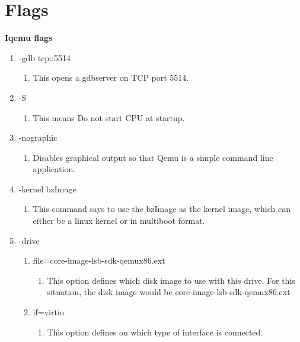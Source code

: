 \documentclass[journal,10pt,onecolumn,compsoc]{IEEEtran} \usepackage[margin=1.0in]{geometry} \usepackage{pdfpages}
\begin{document}
\section {Flags}
\textbf{Iqemu flags}
\begin{enumerate}

\item -gdb tcp::5514
	\begin{enumerate}[label=(\Alph*)]
		\item 	This opens a gdbserver on TCP port 5514.
	\end{enumerate}

\item -S
	\begin{enumerate}[label=(\Alph*)]
		\item 	This means Do not start CPU at startup.
	\end{enumerate}

\item -nographic
	\begin{enumerate}[label=\Alph*]
		\item 	Disables graphical output so that Qemu is a simple command line application.
	\end{enumerate}

\item -kernel bzImage
	\begin{enumerate}[label=\Alph*]
		\item 	This command says to use the bzImage as the kernel image, which can either be a linux kernel or in multiboot format.
	\end{enumerate}

\item -drive
	\begin{enumerate}[label=\Alph*]
		\item file=core-image-lsb-sdk-qemux86.ext
			\begin{enumerate}[label=(\alph*)]
				\item This option defines which disk image to use with this drive. For this situation, the disk image would be core-image-lsb-sdk-qemux86.ext
			\end{enumerate}
		\item if=virtio
			\begin{enumerate}[label=(\alph*)]
				\item This option defines on which type of interface is connected. 
			\end{enumerate}
	\end{enumerate}


\end{enumerate}
\end{document}
